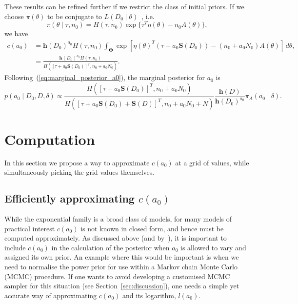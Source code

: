 \documentclass[a4paper, notitlepage, 11pt]{article}
\begin{document}
These results can be refined further if we restrict the class of initial priors.
If we choose $\pi(\theta)$ to be conjugate to $L(D_0 \mid \theta)$~\citep{Diaconis1979}, i.e.
\begin{equation*}
 \label{eq:conj_exp_family}
 \pi(\theta \mid \tau, n_0) = H(\tau, n_0) \exp\{ \tau^T\eta(\theta) - n_0A(\theta) \},
\end{equation*}
we have 
\begin{align}
\nonumber
 c(a_0) &= \boldsymbol h(D_0)^{a_0} H(\tau, n_0) \int_{\boldsymbol\Theta}  \exp \left[ \eta(\theta)^T \left( \tau + a_0\boldsymbol S(D_0) \right) -(n_0  + a_0N_0) A(\theta) \right] \, d\theta, \\
  \label{eq:expo_family_const_conj}
 &= \frac{\boldsymbol h(D_0)^{a_0} H(\tau, n_0)}{H\left( \left[\tau + a_0\boldsymbol S(D_0)\right]^T, n_0  + a_0N_0 \right)}.
\end{align}
Following~(\ref{eq:marginal_posterior_a0}), the marginal posterior for $a_0$ is 
\begin{equation}
 \label{eq:marginal_posterior_a0_expoFamily}
 p(a_0 \mid D_0, D, \delta) \propto \frac{H\left( \left[\tau + a_0\boldsymbol S(D_0)\right]^T, n_0  + a_0N_0 \right)}{H\left( \left[\tau + a_0\boldsymbol S(D_0) + \boldsymbol S(D) \right]^T, n_0  + a_0N_0 + N \right)} \frac{\boldsymbol h(D)}{\boldsymbol h(D_0)^{a_0} } \pi_A(a_0 \mid \delta).
\end{equation}

\section{Computation}
\label{sec:computation}

In this section we propose a way to approximate $c(a_0)$ at a grid of values, while simultaneously picking the grid values themselves.

\subsection{Efficiently approximating $c(a_0)$}
\label{sec:efficient_computation_ca0}

While the exponential family is a broad class of models, for many models of practical interest $c(a_0)$ is not known in closed form, and hence must be computed approximately.
As discussed above (and by~\cite{Neuenschwander2009}), it is important to include $c(a_0)$ in the calculation of the posterior when $a_0$ is allowed to vary and assigned its own prior.
An example where this would be important is when we need to normalise the power prior for use within a Markov chain Monte Carlo (MCMC) procedure.
If one wants to avoid developing a customised MCMC sampler for this situation (see Section~\ref{sec:discussion}), one needs a simple yet accurate way of approximating $c(a_0)$ and its logarithm, $l(a_0)$.
\end{document}
